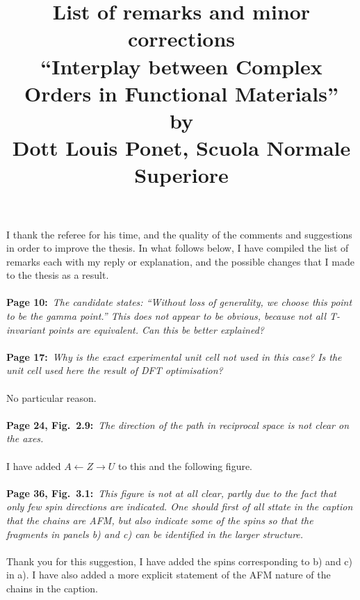 \documentclass[a4, UTF8]{article}
\begin{document}
\title{List of remarks and minor corrections\\
\large ``Interplay between Complex Orders in Functional Materials''\\
by\\
Dott Louis Ponet, Scuola Normale Superiore}
\date{}
\maketitle
I thank the referee for his time, and the quality of the comments and suggestions in order to improve the thesis.
In what follows below, I have compiled the list of remarks each with my reply or explanation, and the possible changes that I made to the thesis as a result.
\\\\
{\bf Page 10:}~{\it The candidate states: ``Without loss of generality, we choose this point to be the gamma point.'' This does not appear to be obvious, because not all T-invariant points are equivalent. Can this be better explained?}
\\\\
{\bf Page 17:}~{\it Why is the exact experimental unit cell not used in this case? Is the unit cell used here the result of DFT optimisation?}
\\\\
No particular reason.
\\\\
{\bf Page 24, Fig.~2.9:}~{\it The direction of the path in reciprocal space is not clear on the axes.}
\\\\
I have added $A \leftarrow Z \rightarrow U$ to this and the following figure.
\\\\
{\bf Page 36, Fig.~3.1:}~{\it This figure is not at all clear, partly due to the fact that only few spin directions are indicated. One should first of all sttate in the caption that the chains are AFM, but also indicate some of the spins so that the fragments in panels b) and c) can be identified in the larger structure.}
\\\\
Thank you for this suggestion, I have added the spins corresponding to b) and c) in a).
I have also added a more explicit statement of the AFM nature of the chains in the caption.
\end{document}
